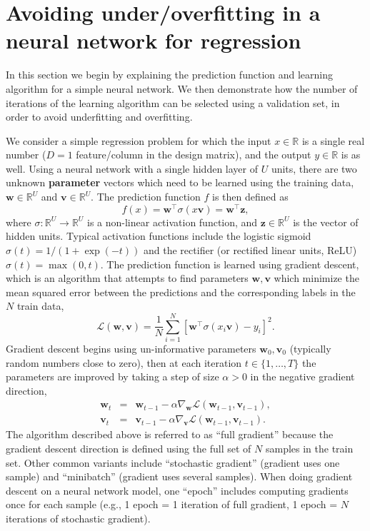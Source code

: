\documentclass[12pt]{article}
\newcommand{\keyword}[1]{\textbf{#1}}
\begin{document}
\section{Avoiding under/overfitting in a neural network for regression}

In this section we begin by explaining the prediction function and
learning algorithm for a simple neural network. We then demonstrate
how the number of iterations of the learning algorithm can be selected
using a validation set, in order to avoid underfitting and
overfitting. 

We consider a simple regression problem for which the input
$x\in\mathbb R$ is a single real number ($D=1$ feature/column in the
design matrix), and the output $y\in\mathbb R$ is as well. Using a
neural network with a single hidden layer of $U$ units, there are two
unknown \keyword{parameter} vectors which need to be learned using the
training data, $\mathbf w\in \mathbb R^U$ and
$\mathbf v\in \mathbb R^U$. The prediction function $f$ is then
defined as
\begin{equation}
  f(x) = \mathbf w^\intercal \sigma( x \mathbf v ) = \mathbf w^\intercal \mathbf z,
\end{equation}
where $\sigma:\mathbb R^U\rightarrow \mathbb R^U$ is a non-linear
activation function, and $\mathbf z\in \mathbb R^U$ is the vector of
hidden units. Typical activation functions include the logistic
sigmoid $\sigma(t)=1/(1+\exp(-t))$ and the rectifier (or rectified
linear units, ReLU) $\sigma(t)=\max(0, t)$. The prediction function is
learned using gradient descent, which is an algorithm that attempts to
find parameters $\mathbf w,\mathbf v$ which minimize the mean squared
error between the predictions and the corresponding labels in the $N$
train data,
\begin{equation}
  \mathcal L(\mathbf w, \mathbf v) = \frac{1}{N} \sum_{i=1}^N [ \mathbf w^\intercal \sigma( x_i \mathbf v ) - y_i ]^2. \label{eq:loss}
\end{equation}
Gradient descent begins using un-informative parameters
$\mathbf w_0,\mathbf v_0$ (typically random numbers close to zero),
then at each iteration $t\in\{1,\dots, T\}$ the parameters are
improved by taking a step of size $\alpha>0$ in the negative gradient
direction,
\begin{eqnarray}
  \mathbf w_t &=& \mathbf w_{t-1} - \alpha \nabla_{\mathbf w} \mathcal L(\mathbf w_{t-1}, \mathbf v_{t-1}),\\
  \mathbf v_t &=& \mathbf v_{t-1} - \alpha \nabla_{\mathbf v} \mathcal L(\mathbf w_{t-1}, \mathbf v_{t-1}).
\end{eqnarray}
The algorithm described above is referred to as ``full gradient''
because the gradient descent direction is defined using the full set
of $N$ samples in the train set. Other common variants include
``stochastic gradient'' (gradient uses one sample) and ``minibatch''
(gradient uses several samples). When doing gradient descent on a
neural network model, one ``epoch'' includes computing gradients once
for each sample (e.g., 1 epoch = 1 iteration of full gradient, 1 epoch
= $N$ iterations of stochastic gradient).
\end{document}
